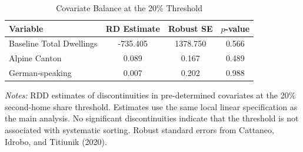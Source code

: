 \begin{table}[htbp]
\centering
\caption{Covariate Balance at the 20\% Threshold}
\label{tab:balance}
\begin{tabular}{lccc}
\toprule
Variable & RD Estimate & Robust SE & $p$-value \\
\midrule
Baseline Total Dwellings & -735.405 & 1378.750 & 0.566 \\
Alpine Canton & 0.089 & 0.167 & 0.489 \\
German-speaking & 0.007 & 0.202 & 0.988 \\
\bottomrule
\end{tabular}
\begin{tablenotes}[flushleft]\footnotesize
\item \textit{Notes:} RDD estimates of discontinuities in pre-determined covariates at the 20\% second-home share threshold. Estimates use the same local linear specification as the main analysis. No significant discontinuities indicate that the threshold is not associated with systematic sorting. Robust standard errors from Cattaneo, Idrobo, and Titiunik (2020).
\end{tablenotes}
\end{table}
